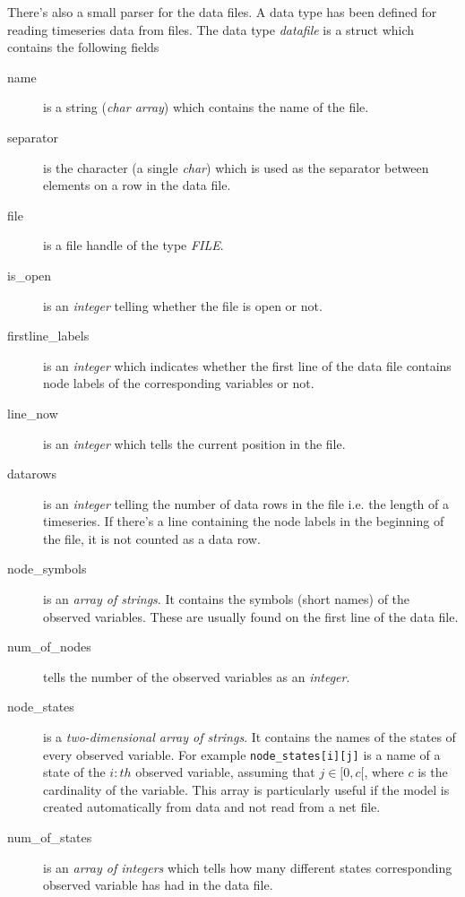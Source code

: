 \documentclass[12pt,a4paper]{report}
\begin{document}
There's also a small parser for the data files. A data type has been
defined for reading timeseries data from files. The data type 
{\it datafile} is a struct which contains the following fields
\begin{description}
\item[name] is a string ({\it char array}) which contains the 
name of the file.

\item[separator] is the character (a single {\it char}) which is used 
as the separator between elements on a row in the data file.

\item[file] is a file handle of the type {\it FILE}.

\item[is\_open] is an {\it integer} telling whether the file is open
or not.

\item[firstline\_labels] is an {\it integer} which indicates whether
the first line of the data file contains node labels of the
corresponding variables or not. 

\item[line\_now] is an {\it integer} which tells the current position
in the file.

\item[datarows] is an {\it integer} telling the number of data rows in
the file i.e. the length of a timeseries. If there's a line containing
the node labels in the beginning of the file, it is not counted as a
data row.

\item[node\_symbols] is an {\it array of strings}. It contains the
symbols (short names) of the observed variables. These are usually
found on the first line of the data file.

\item[num\_of\_nodes] tells the number of the observed variables as an
{\it integer}.

\item[node\_states] is a {\it two-dimensional array of strings}. It
contains the names of the states of every observed variable. For
example \verb+node_states[i][j]+ is a name of a state of the $i:th$
observed variable, assuming that $j \in [0, c[$, where $c$ is the 
cardinality of the variable. This array is particularly useful if the
model is created automatically from data and not read from a net file.

\item[num\_of\_states] is an {\it array of integers} which tells how
many different states corresponding observed variable has had in the
data file.
\end{description}
\end{document}
